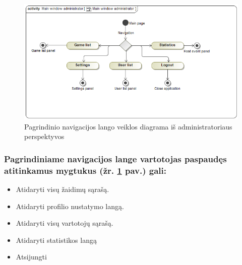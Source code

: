 \documentclass{VUMIFPSkursinis}
\begin{document}
			\begin{figure}[H]
				\centering
				\includegraphics[scale=0.5]{img/MainWindowAdministrator}
				\caption{Pagrindinio navigacijos lango veiklos diagrama iš administratoriaus perspektyvos}
				\label{img:MainWindowAdministrator}
			\end{figure}
			\subsubsection*{Pagrindiniame navigacijos lange vartotojas paspaudęs atitinkamus mygtukus (žr. \ref{img:MainWindowAdministrator} pav.) gali:}
				\renewcommand{\labelitemi}{$\bullet$}
				\begin{itemize}
					\item Atidaryti visų žaidimų sąrašą.
					\item Atidaryti profilio nustatymo langą.
					\item Atidaryti visų vartotojų sąrašą.
					\item Atidaryti statistikos langą
					\item Atsijungti
				\end{itemize}
				
\end{document}
